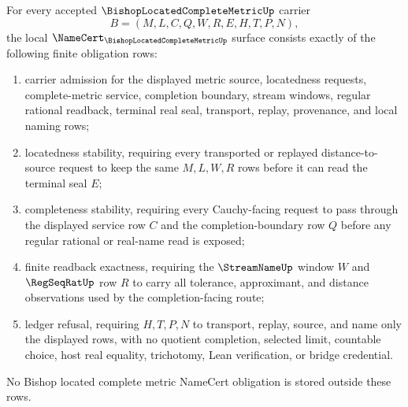 \begin{theorem}
\label{thm:bishop-located-complete-metric-namecert-obligations}
For every accepted $\BishopLocatedCompleteMetricUp$ carrier
$$
B=(M,L,C,Q,W,R,E,H,T,P,N),
$$
the local $\NameCert_{\BishopLocatedCompleteMetricUp}$ surface consists exactly of the following finite obligation rows:
\begin{enumerate}
\item carrier admission for the displayed metric source, locatedness requests, complete-metric service, completion boundary, stream windows, regular rational readback, terminal real seal, transport, replay, provenance, and local naming rows;
\item locatedness stability, requiring every transported or replayed distance-to-source request to keep the same $M,L,W,R$ rows before it can read the terminal seal $E$;
\item completeness stability, requiring every Cauchy-facing request to pass through the displayed service row $C$ and the completion-boundary row $Q$ before any regular rational or real-name read is exposed;
\item finite readback exactness, requiring the $\StreamNameUp$ window $W$ and $\RegSeqRatUp$ row $R$ to carry all tolerance, approximant, and distance observations used by the completion-facing route;
\item ledger refusal, requiring $H,T,P,N$ to transport, replay, source, and name only the displayed rows, with no quotient completion, selected limit, countable choice, host real equality, trichotomy, Lean verification, or bridge credential.
\end{enumerate}
No Bishop located complete metric NameCert obligation is stored outside these rows.
\end{theorem}
